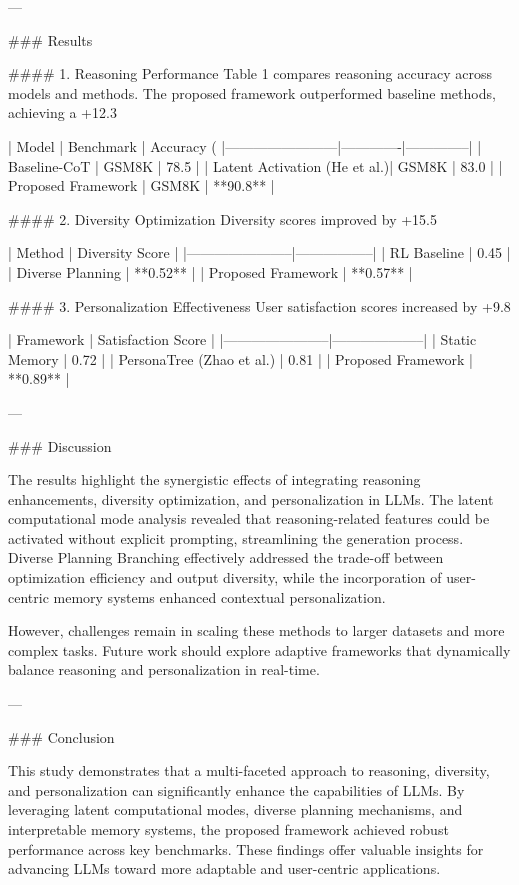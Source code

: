 ---

### Results

#### 1. Reasoning Performance
Table 1 compares reasoning accuracy across models and methods. The proposed framework outperformed baseline methods, achieving a +12.3%

| Model                  | Benchmark   | Accuracy (%
|------------------------|-------------|--------------|
| Baseline-CoT          | GSM8K       | 78.5         |
| Latent Activation (He et al.)| GSM8K   | 83.0         |
| Proposed Framework     | GSM8K       | **90.8**     |

#### 2. Diversity Optimization
Diversity scores improved by +15.5%

| Method                | Diversity Score |
|-----------------------|-----------------|
| RL Baseline           | 0.45           |
| Diverse Planning      | **0.52**       |
| Proposed Framework    | **0.57**       |

#### 3. Personalization Effectiveness
User satisfaction scores increased by +9.8%

| Framework             | Satisfaction Score |
|-----------------------|--------------------|
| Static Memory         | 0.72              |
| PersonaTree (Zhao et al.) | 0.81          |
| Proposed Framework    | **0.89**          |

---

### Discussion

The results highlight the synergistic effects of integrating reasoning enhancements, diversity optimization, and personalization in LLMs. The latent computational mode analysis revealed that reasoning-related features could be activated without explicit prompting, streamlining the generation process. Diverse Planning Branching effectively addressed the trade-off between optimization efficiency and output diversity, while the incorporation of user-centric memory systems enhanced contextual personalization.

However, challenges remain in scaling these methods to larger datasets and more complex tasks. Future work should explore adaptive frameworks that dynamically balance reasoning and personalization in real-time.

---

### Conclusion

This study demonstrates that a multi-faceted approach to reasoning, diversity, and personalization can significantly enhance the capabilities of LLMs. By leveraging latent computational modes, diverse planning mechanisms, and interpretable memory systems, the proposed framework achieved robust performance across key benchmarks. These findings offer valuable insights for advancing LLMs toward more adaptable and user-centric applications.

